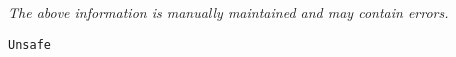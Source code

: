 \label{pkg:unsafe}

{\tiny \it The above information is manually maintained and may contain errors.}
\begin{verbatim}
Unsafe
\end{verbatim}
